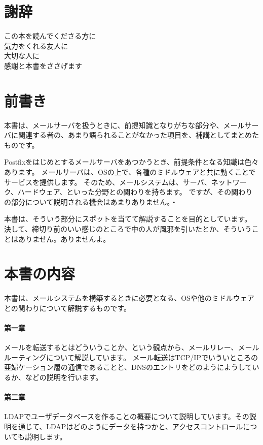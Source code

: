 \section*{謝辞}
\begin{center}
この本を読んでくださる方に \\
気力をくれる友人に \\
大切な人に \\
感謝と本書をささげます
\end{center}

\section*{前書き}

本書は、メールサーバを扱うときに、前提知識となりがちな部分や、メールサーバに関連する者の、あまり語られることがなかった項目を、補講としてまとめたものです。

Postfixをはじめとするメールサーバをあつかうとき、前提条件となる知識は色々あります。
メールサーバは、OSの上で、各種のミドルウェアと共に動くことでサービスを提供します。
そのため、メールシステムは、サーバ、ネットワーク、ハードウェア、といった分野との関わりを持ちます。
ですが、その関わりの部分について説明される機会はあまりありません。・

本書は、そういう部分にスポットを当てて解説することを目的としています。
決して、締切り前のいい感じのところで中の人が風邪を引いたとか、そういうことはありません。ありませんよ。


\section*{本書の内容}
本書は、メールシステムを構築するときに必要となる、OSや他のミドルウェアとの関わりについて解説するものです。

\paragraph{第一章}
メールを転送するとはどういうことか、という観点から、メールリレー、メールルーティングについて解説しています。
メール転送はTCP/IPでいういところの亜婦ケーション層の通信であることと、DNSのエントリをどのようにようしているか、などの説明を行います。

\paragraph{第二章}
LDAPでユーザデータベースを作ることの概要について説明しています。その説明を通じて、LDAPはどのようにデータを持つかと、アクセスコントロールについても説明します。


